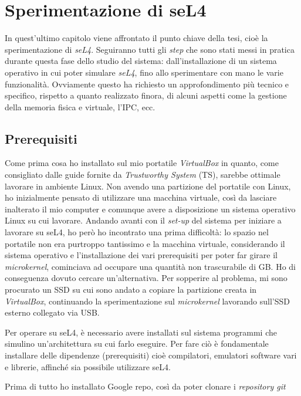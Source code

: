 \chapter{Sperimentazione di seL4}
In quest'ultimo capitolo viene affrontato il punto chiave della tesi, cioè la sperimentazione di \textit{seL4}. Seguiranno tutti gli \textit{step} che sono stati messi in pratica durante questa fase dello studio del sistema: dall'installazione di un sistema operativo in cui poter simulare \textit{seL4}, fino allo sperimentare con mano le varie funzionalità. Ovviamente questo ha richiesto un approfondimento più tecnico e specifico, rispetto a quanto realizzato finora, di alcuni aspetti come la gestione della memoria fisica e virtuale, l'IPC, ecc.

\section{Prerequisiti}
Come prima cosa ho installato sul mio portatile \textit{VirtualBox} in quanto, come consigliato dalle guide fornite da \textit{Trustworthy System} (TS), sarebbe ottimale lavorare in ambiente Linux. Non avendo una partizione del portatile con Linux, ho inizialmente pensato di utilizzare una macchina virtuale, così da lasciare inalterato il mio computer e comunque avere a disposizione un sistema operativo Linux su cui lavorare. Andando avanti con il \textit{set-up} del sistema per iniziare a lavorare su seL4, ho però ho incontrato una prima difficoltà: lo spazio nel portatile non era purtroppo tantissimo e la macchina virtuale, considerando il sistema operativo e l'installazione dei vari prerequisiti per poter far girare il \textit{microkernel}, cominciava ad occupare una quantità non trascurabile di GB. Ho di conseguenza dovuto cercare un'alternativa. Per sopperire al problema, mi sono procurato un SSD su cui sono andato a copiare la partizione creata in \textit{VirtualBox}, continuando la sperimentazione sul \textit{microkernel} lavorando sull'SSD esterno collegato via USB.

Per operare su seL4, è necessario avere installati sul sistema programmi che simulino un'architettura su cui farlo eseguire. Per fare ciò è fondamentale installare delle dipendenze (prerequisiti) cioè compilatori, emulatori software vari e librerie, affinché sia possibile utilizzare seL4.

Prima di tutto ho installato Google repo, così da poter clonare i \textit{repository git}

